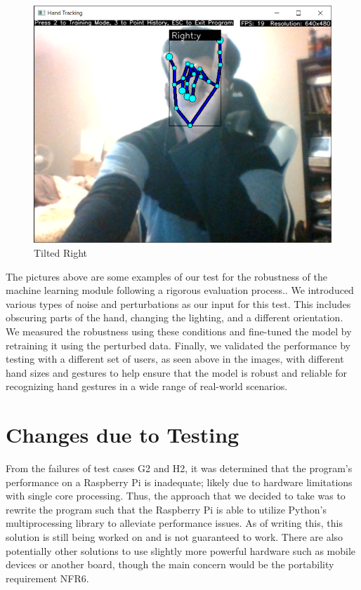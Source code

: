 \documentclass[12pt, titlepage]{article}
\begin{document}
\begin{figure}[!ht]
  \includegraphics[width=\linewidth]{right_y.png}
  \caption{Tilted Right}\label{fig:Tilted Right}
\endminipage\hfill
\end{figure}
The pictures above are some examples of our test for the robustness of the machine 
learning module following a rigorous evaluation process.. We introduced various types 
of noise and perturbations as our input for this test. This includes obscuring parts 
of the hand, changing the lighting, and a different orientation. We measured the robustness
using these conditions and fine-tuned the model by retraining it using the perturbed data. 
Finally, we validated the performance by testing with a different set of users, as seen above 
in the images, with different hand sizes and gestures to help ensure that the model is robust 
and reliable for recognizing hand gestures in a wide range of real-world scenarios.
\endminipage

\section{Changes due to Testing}

From the failures of test cases G2 and H2, it was determined that the program’s performance on a Raspberry Pi is inadequate; 
likely due to hardware limitations with single core processing. Thus, the approach that we decided to take was to rewrite the 
program such that the Raspberry Pi is able to utilize Python’s multiprocessing library to alleviate performance issues. As of 
writing this, this solution is still being worked on and is not guaranteed to work. There are also potentially other solutions 
to use slightly more powerful hardware such as mobile devices or another board, though the main concern would be the portability requirement NFR6.
\end{document}
